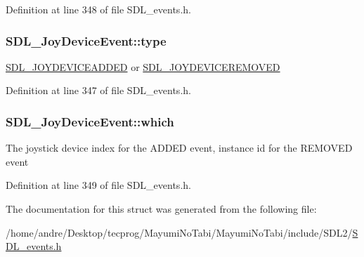 Definition at line 348 of file S\-D\-L\-\_\-events.\-h.

\hypertarget{struct_s_d_l___joy_device_event_a51f060ba1dd5669b458e9c97aece667e}{
\subsubsection[{type}]{ S\-D\-L\-\_\-\-Joy\-Device\-Event\-::type}}\label{struct_s_d_l___joy_device_event_a51f060ba1dd5669b458e9c97aece667e}
\hyperlink{_s_d_l__events_8h_a3b589e89be6b35c02e0dd34a55f3fccaa0500c4e830a1822e6d0a90294c3f1393}{S\-D\-L\-\_\-\-J\-O\-Y\-D\-E\-V\-I\-C\-E\-A\-D\-D\-E\-D} or \hyperlink{_s_d_l__events_8h_a3b589e89be6b35c02e0dd34a55f3fccaa4e2d7a1067dc56abeee393d46309ecd0}{S\-D\-L\-\_\-\-J\-O\-Y\-D\-E\-V\-I\-C\-E\-R\-E\-M\-O\-V\-E\-D} 

Definition at line 347 of file S\-D\-L\-\_\-events.\-h.

\hypertarget{struct_s_d_l___joy_device_event_af9b295798f033b799ebbda7de6cb5a7e}{
\subsubsection[{which}]{ S\-D\-L\-\_\-\-Joy\-Device\-Event\-::which}}\label{struct_s_d_l___joy_device_event_af9b295798f033b799ebbda7de6cb5a7e}
The joystick device index for the A\-D\-D\-E\-D event, instance id for the R\-E\-M\-O\-V\-E\-D event 

Definition at line 349 of file S\-D\-L\-\_\-events.\-h.



The documentation for this struct was generated from the following file\-:\begin{DoxyCompactItemize}
\item 
/home/andre/\-Desktop/tecprog/\-Mayumi\-No\-Tabi/\-Mayumi\-No\-Tabi/include/\-S\-D\-L2/\hyperlink{_s_d_l__events_8h}{S\-D\-L\-\_\-events.\-h}\end{DoxyCompactItemize}
